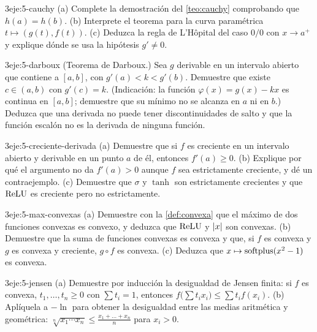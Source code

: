 \begin{ejercicio}{3}{eje:5-cauchy}
(a) Complete la demostración del \cref{teo:cauchy} comprobando que $h(a)=h(b)$. (b) Interprete el teorema para la curva paramétrica $t\mapsto(g(t),f(t))$. (c) Deduzca la regla de L'Hôpital del caso $0/0$ con $x\to a^{+}$ y explique dónde se usa la hipótesis $g'\ne0$.
\end{ejercicio}

\begin{ejercicio}{3}{eje:5-darboux}
(Teorema de Darboux.) Sea $g$ derivable en un intervalo abierto que contiene a $[a,b]$, con $g'(a)<k<g'(b)$. Demuestre que existe $c\in(a,b)$ con $g'(c)=k$. (Indicación: la función $\varphi(x)=g(x)-kx$ es continua en $[a,b]$; demuestre que su mínimo no se alcanza en $a$ ni en $b$.) Deduzca que una derivada no puede tener discontinuidades de salto y que la función escalón no es la derivada de ninguna función.
\end{ejercicio}

\begin{ejercicio}{3}{eje:5-creciente-derivada}
(a) Demuestre que si $f$ es creciente en un intervalo abierto y derivable en un punto $a$ de él, entonces $f'(a)\ge0$. (b) Explique por qué el argumento no da $f'(a)>0$ aunque $f$ sea estrictamente creciente, y dé un contraejemplo. (c) Demuestre que $\sigma$ y $\tanh$ son estrictamente crecientes y que $\operatorname{ReLU}$ es creciente pero no estrictamente.
\end{ejercicio}

\begin{ejercicio}{3}{eje:5-max-convexas}
(a) Demuestre con la \cref{def:convexa} que el máximo de dos funciones convexas es convexo, y deduzca que $\operatorname{ReLU}$ y $\lvert x\rvert$ son convexas. (b) Demuestre que la suma de funciones convexas es convexa y que, si $f$ es convexa y $g$ es convexa y creciente, $g\circ f$ es convexa. (c) Deduzca que $x\mapsto\operatorname{softplus}(x^{2}-1)$ es convexa.
\end{ejercicio}

\begin{ejercicio}{3}{eje:5-jensen}
(a) Demuestre por inducción la desigualdad de Jensen finita: si $f$ es convexa, $t_1,\dots,t_n\ge0$ con $\sum t_i=1$, entonces $f\bigl(\sum t_ix_i\bigr)\le\sum t_if(x_i)$. (b) Aplíquela a $-\ln$ para obtener la desigualdad entre las medias aritmética y geométrica: $\sqrt[n]{x_1\cdots x_n}\le\frac{x_1+\dots+x_n}{n}$ para $x_i>0$.
\end{ejercicio}
